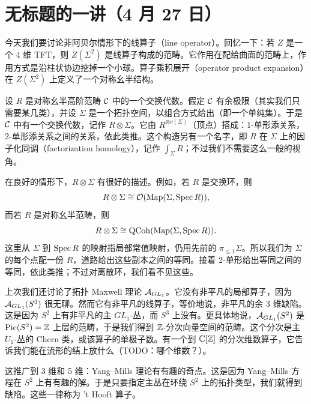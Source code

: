 \section[无标题（4 月 27 日）]{无标题的一讲（4 月 27 日）}


今天我们要讨论非阿贝尔情形下的线算子（line operator）。回忆一下：若 $Z$ 是一个 4 维 TFT，则 $Z(\Sigma^2)$ 是线算子构成的范畴。它作用在配给曲面的范畴上，作用方式是沿柱状协边挖掉一个小球。算子乘积展开（operator product expansion）在 $Z(\Sigma^2)$ 上定义了一个对称幺半结构。

设 $R$ 是对称幺半高阶范畴 $\mathcal{C}$ 中的一个交换代数。假定 $\mathcal{C}$ 有余极限（其实我们只需要某几类），并设 $\Sigma$ 是一个拓扑空间，以组合方式给出（即一个单纯集）。于是 $\mathcal{C}$ 中有一个交换代数，记作 $R\otimes\Sigma$。它由 $R^{\otimes v(\Sigma)}$（顶点）搭成：1-单形添关系，2-单形添关系之间的关系，依此类推。这个构造另有一个名字，即 $R$ 在 $\Sigma$ 上的因子化同调（factorization homology），记作 $\int_\Sigma R$；不过我们不需要这么一般的视角。

在良好的情形下，$R\otimes\Sigma$ 有很好的描述。例如，若 $R$ 是交换环，则
\[
  R\otimes\Sigma \cong \mathcal{O}(\mathrm{Map}(\Sigma,\operatorname{Spec} R)),
\]
而若 $R$ 是对称幺半范畴，则
\[
  R\otimes\Sigma \cong \mathrm{QCoh}(\mathrm{Map}(\Sigma,\operatorname{Spec} R)).
\]
这里从 $\Sigma$ 到 $\operatorname{Spec} R$ 的映射指局部常值映射，仍用先前的 $\pi_{\le 1}\Sigma$。所以我们为 $\Sigma$ 的每个点配一份 $R$，道路给出这些副本之间的等同。接着 2-单形给出等同之间的等同，依此类推；不过对离散环，我们看不见这些。


上次我们还讨论了拓扑 Maxwell 理论 $\mathcal{A}_{GL_1}$。它没有非平凡的局部算子，因为 $\mathcal{A}_{GL_1}(S^3)$ 很无聊。然而它有非平凡的线算子，等价地说，非平凡的余 3 维缺陷。这是因为 $S^2$ 上有非平凡的主 $GL_1$-丛，而 $S^3$ 上没有。更具体地说，$\mathcal{A}_{GL_1}(S^2)$ 是 $\operatorname{Pic}(S^2)=\mathbb{Z}$ 上层的范畴，于是我们得到 $\mathbb{Z}$-分次向量空间的范畴。这个分次是主 $U_1$-丛的 Chern 类，或该算子的单极子数。有一个到 $\mathbb{C}[\mathbb{Z}]$ 的分次维数算子，它告诉我们能在流形的结上放什么（TODO：哪个维数？）。

\begin{remark}
这推广到 3 维和 5 维：Yang–Mills 理论有有趣的奇点。这是因为 Yang–Mills 方程在 $S^2$ 上有有趣的解。于是只要指定主丛在环绕 $S^2$ 上的拓扑类型，我们就得到缺陷。这些一律称为 't Hooft 算子。
\end{remark}

